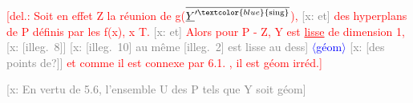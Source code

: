 \documentclass[11pt]{article}
\newcommand{\scanpage}[1]{\par\bigskip\noindent{\small\sffamily[scan #1]}\par}
\newcommand{\mspage}[1]{{\small\sffamily[p.\,#1]}}
\newcommand{\hand}[1]{\textcolor{blue}{#1}}
\newcommand{\inserted}[2][]{\textcolor{blue}{$\langle$#2$\rangle$}}
\newcommand{\deleted}[1]{\textcolor{red}{[\textsf{del.:} #1]}}
\newcommand{\xout}[1]{\textcolor{gray}{[\textsf{x:} #1]}}
\newcommand{\uline}[1]{\underline{#1}}
\newcommand{\unsure}[1]{[#1?]}
\newcommand{\illegible}[1]{[\textsf{illeg.\ #1}]}
\begin{document}
\deleted{Soit  en effet  Z  la  réunion  de  g($\overline{\underline{Y}'^{\hand{\mathrm{sing}}}}$), \xout{et} des hyperplans
de P  définis par les  f(x), x  T.  \xout{et}  Alors pour   P - Z,  Y   est
\uline{lisse} de dimension 1, \xout{\illegible{8}}
\xout{\illegible{10} au même \illegible{2} est lisse au dess}
\inserted{géom}
\xout{\unsure{des points de}}  et comme  il est connexe par 6.1. , il est géom irréd.}

\mspage{51}

\clearpage
\scanpage{25/52}
\mspage{47}

\xout{En vertu de 5.6, l'ensemble U des P tels que Y soit géom}
\end{document}

